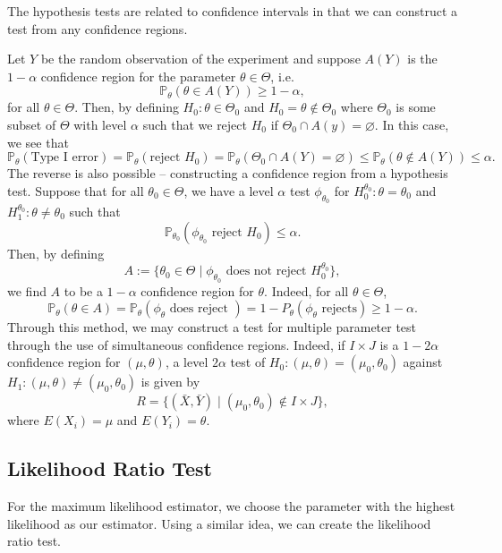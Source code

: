\documentclass[
]{article}
\theoremstyle{definition}
\theoremstyle{definition}
\begin{document}
The hypothesis tests are related to confidence intervals in that we can
construct a test from any confidence regions.

Let \(Y\) be the random observation of the experiment and suppose
\(A(Y)\) is the \(1 - \alpha\) confidence region for the parameter
\(\theta \in \Theta\), i.e.
\[\mathbb{P}_\theta(\theta \in A(Y)) \ge 1 - \alpha,\] for all
\(\theta \in \Theta\). Then, by defining \(H_0 : \theta \in \Theta_0\)
and \(H_0 = \theta \not\in \Theta_0\) where \(\Theta_0\) is some subset
of \(\Theta\) with level \(\alpha\) such that we reject \(H_0\) if
\(\Theta_0 \cap A(y) = \varnothing\). In this case, we see that
\[\mathbb{P}_\theta(\text{Type I error}) = \mathbb{P}_\theta(\text{reject } H_0) 
  = \mathbb{P}_\theta(\Theta_0 \cap A(Y) = \varnothing) \le 
  \mathbb{P}_\theta(\theta \not\in A(Y)) \le \alpha.\] The reverse is
also possible -- constructing a confidence region from a hypothesis
test. Suppose that for all \(\theta_0 \in \Theta\), we have a level
\(\alpha\) test \(\phi_{\theta_0}\) for
\(H_0^{\theta_0} : \theta = \theta_0\) and
\(H_1^{\theta_0} : \theta \neq \theta_0\) such that
\[\mathbb{P}_{\theta_0}(\phi_{\theta_0}\text{ reject } H_0) \le \alpha.\]
Then, by defining
\[A := \{\theta_0 \in \Theta \mid \phi_{\theta_0} \text{ does not reject } H_0^{\theta_0}\},\]
we find \(A\) to be a \(1 - \alpha\) confidence region for \(\theta\).
Indeed, for all \(\theta \in \Theta\),
\[\mathbb{P}_\theta(\theta \in A) = \mathbb{P}_\theta(\phi_\theta
  \text{ does reject }) = 1 - P_{\theta}(\phi_\theta \text{ rejects}) 
  \ge 1 - \alpha.\] Through this method, we may construct a test for
multiple parameter test through the use of simultaneous confidence
regions. Indeed, if \(I \times J\) is a \(1 - 2\alpha\) confidence
region for \((\mu, \theta)\), a level \(2\alpha\) test of
\(H_0 : (\mu, \theta) = (\mu_0, \theta_0)\) against
\(H_1 : (\mu, \theta) \neq (\mu_0, \theta_0)\) is given by
\[R = \{(\bar{X}, \bar{Y}) \mid (\mu_0, \theta_0) \not\in I \times J\},\]
where \(E(X_i) = \mu\) and \(E(Y_i) = \theta\).

\hypertarget{likelihood-ratio-test}{%
\subsection{Likelihood Ratio Test}\label{likelihood-ratio-test}}

For the maximum likelihood estimator, we choose the parameter with the
highest likelihood as our estimator. Using a similar idea, we can create
the likelihood ratio test.
\end{document}
